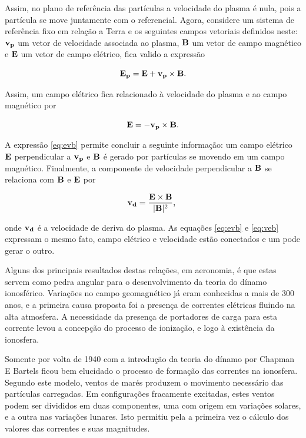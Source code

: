 Assim, no plano de referência das partículas a velocidade do plasma é nula, pois a partícula se move juntamente com o referencial. Agora, considere um sistema de referência fixo em relação a Terra e os seguintes campos vetoriais definidos neste: ${\bf v_p}$ um vetor de velocidade associada ao plasma, ${\bf B}$ um vetor de campo magnético e ${\bf E}$ um vetor de campo elétrico, fica valido a expressão

\begin{equation}
{\bf E_p}= {\bf E}+{\bf v_p}\times{\bf B}\mbox{.}
\end{equation}

Assim, um campo elétrico fica relacionado à velocidade do plasma e ao campo magnético por

\begin{equation}\label{eq:evb}
{\bf E}=-{\bf v_p}\times{\bf B}\mbox{.}
\end{equation}

A expressão \eqref{eq:evb} permite concluir a seguinte informação: um campo elétrico ${\bf E}$ perpendicular a ${\bf v_p}$ e ${\bf B}$ é gerado por partículas se movendo em um campo magnético. Finalmente, a componente de velocidade perpendicular a ${\bf B}$ se relaciona com ${\bf B}$ e ${\bf E}$ por

\begin{equation}\label{eq:veb}
{\bf v_d}=\frac{{\bf E}\times{\bf B}}{|{\bf B}|^2}\mbox{,}~
\end{equation}

onde ${\bf v_d}$ é a velocidade de deriva do plasma. As equações \eqref{eq:evb} e \eqref{eq:veb} expressam o mesmo fato, campo elétrico e velocidade estão conectados e um pode gerar o outro.

Alguns dos principais resultados destas relações, em aeronomia, é que estas servem como pedra angular para o desenvolvimento da teoria do dínamo ionosférico. Variações no campo geomagnético já eram conhecidas a mais de 300 anos, e a primeira causa proposta foi a presença de correntes elétricas fluindo na alta atmosfera. A necessidade da presença de portadores de carga para esta corrente levou a concepção do processo de ionização, e logo à existência da ionosfera.

Somente por volta de 1940 com a introdução da teoria do dínamo por Chapman E Bartels ficou bem elucidado o processo de formação das correntes na ionosfera. Segundo este modelo, ventos de marés produzem o movimento necessário das partículas carregadas. Em configurações fracamente excitadas, estes ventos podem ser divididos em duas componentes, uma com origem em variações solares, e a outra nas variações lunares. Isto permitiu pela a primeira vez o cálculo dos valores das correntes e suas magnitudes.


